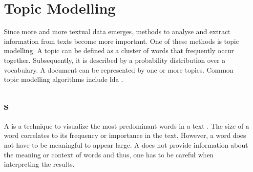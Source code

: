 \section{Topic Modelling}\label{sec:topic-modelling}

Since more and more textual data emerges, methods to analyse and extract information from texts become more important.
One of these methods is topic modelling.
A topic can be defined as a cluster of words that frequently occur together.
Subsequently, it is described by a probability distribution over a vocabulary.
A document can be represented by one or more topics. %
Common topic modelling algorithms include \ac{lda} \cite{topic_modeling2015}.








\subsection{\wordcloud{}s}\label{subsec:word-clouds}

A \wordcloud{} is a technique to visualize the most predominant words in a text \cite{topic_modeling2019}.
The size of a word correlates to its frequency or importance in the text.
However, a word does not have to be meaningful to appear large.
A \wordcloud{} does not provide information about the meaning or context of words and thus, 
one has to be careful when interpreting the results.